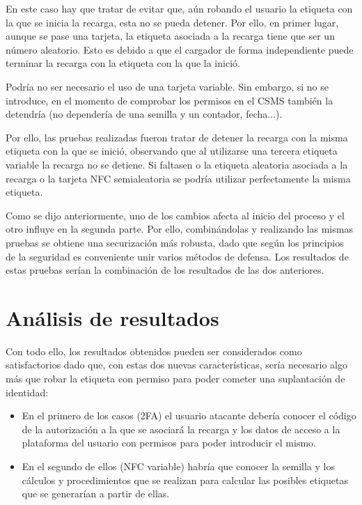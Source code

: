 \documentclass[12pt,a4paper,onecolumn,oneside]{report}
\newcounter{subsubsubsection}[subsubsection]
\begin{document}
En este caso hay que tratar de evitar que, aún robando el usuario la etiqueta con la que se inicia la recarga, esta no se pueda detener. Por ello, en primer lugar, aunque se pase una tarjeta, la etiqueta asociada a la recarga tiene que ser un número aleatorio. Esto es debido a que el cargador de forma independiente puede terminar la recarga con la etiqueta con la que la inició.

Podría no ser necesario el uso de una tarjeta variable. Sin embargo, si no se introduce, en el momento de comprobar los permisos en el CSMS también la detendría (no dependería de una semilla y un contador, fecha...).

Por ello, las pruebas realizadas fueron tratar de detener la recarga con la misma etiqueta con la que se inició, observando que al utilizarse una tercera etiqueta variable la recarga no se detiene. Si faltasen o la etiqueta aleatoria asociada a la recarga o la tarjeta NFC semialeatoria se podría utilizar perfectamente la misma etiqueta.



Como se dijo anteriormente, uno de los cambios afecta al inicio del proceso y el otro influye en la segunda parte. Por ello, combinándolas y realizando las mismas pruebas se obtiene una securización más robusta, dado que según los principios de la seguridad es conveniente unir varios métodos de defensa. Los resultados de estas pruebas serían la combinación de los resultados de las dos anteriores.

\section{Análisis de resultados}

Con todo ello, los resultados obtenidos pueden ser considerados como satisfactorios dado que, con estas dos nuevas características, sería necesario algo más que robar la etiqueta con permiso para poder cometer una suplantación de identidad:

\begin{itemize}
\item En el primero de los casos (2FA) el usuario atacante debería conocer el código de la autorización a la que se asociará la recarga y los datos de acceso a la plataforma del usuario con permisos para poder introducir el mismo.
\item En el segundo de ellos (NFC variable) habría que conocer la semilla y los cálculos y procedimientos que se realizan para calcular las posibles etiquetas que se generarían a partir de ellas.
\end{itemize}
\end{document}
